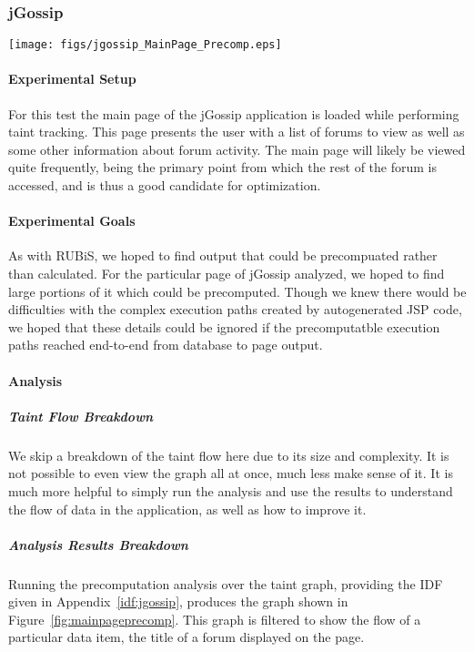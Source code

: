 \documentclass[msc,oneside]{ubcthesis}
\begin{document}
\subsubsection{jGossip} 

\begin{sidewaysfigure}
\centering
\scalebox{0.42}
{\texttt{[image: figs/jgossip\_MainPage\_Precomp.eps]}}
\caption{jGossip Main Page Precomputation Analysis Results} 
\label{fig:mainpageprecomp}
\end{sidewaysfigure}

\paragraph{Experimental Setup}
For this test the main page of the jGossip application is loaded while performing taint tracking. This page presents the user with a list of forums to view as well as some other information about forum activity. The main page will likely be viewed quite frequently, being the primary point from which the rest of the forum is accessed, and is thus a good candidate for optimization.

\paragraph{Experimental Goals}
As with RUBiS, we hoped to find output that could be precompuated rather than calculated. For the particular page of jGossip analyzed, we hoped to find large portions of it which could be precomputed. Though we knew there would be difficulties with the complex execution paths created by autogenerated JSP code, we hoped that these details could be ignored if the precomputatble execution paths reached end-to-end from database to page output. 

\paragraph{Analysis}
\subparagraph{Taint Flow Breakdown}
We skip a breakdown of the taint flow here due to its size and complexity. It is not possible to even view the graph all at once, much less make sense of it. It is much more helpful to simply run the analysis and use the results to understand the flow of data in the application, as well as how to improve it.

\subparagraph{Analysis Results Breakdown}
Running the precomputation analysis over the taint graph, providing the IDF given in Appendix~\ref{idf:jgossip}, produces the graph shown in Figure~\ref{fig:mainpageprecomp}. This graph is filtered to show the flow of a particular data item, the title of a forum displayed on the page.\\
\end{document}
